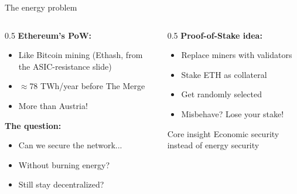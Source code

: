 \ifdefined\PRESENTATION\else\PassOptionsToClass{handout}{beamer}\fi\documentclass[aspectratio=169, lualatex]{beamer}
\begin{document}
\begin{frame}{The energy problem}
	\begin{columns}[c]
		\begin{column}{0.5\textwidth}
			\textbf{Ethereum's PoW:}
			\begin{itemize}
				\item Like Bitcoin mining (Ethash, from the ASIC-resistance slide)
				\item $\approx$78 TWh/year before The Merge
				\item More than Austria!
			\end{itemize}
			\textbf{The question:}
			\begin{itemize}
				\item Can we secure the network...
				\item Without burning energy?
				\item Still stay decentralized?
			\end{itemize}
		\end{column}
		\begin{column}{0.5\textwidth}
			\textbf{Proof-of-Stake idea:}
			\begin{itemize}
				\item Replace miners with validators
				\item Stake ETH as collateral
				\item Get randomly selected
				\item Misbehave? Lose your stake!
			\end{itemize}
			\begin{exampleblock}{Core insight}
				Economic security instead of energy security
			\end{exampleblock}
		\end{column}
	\end{columns}
\end{frame}
\end{document}
